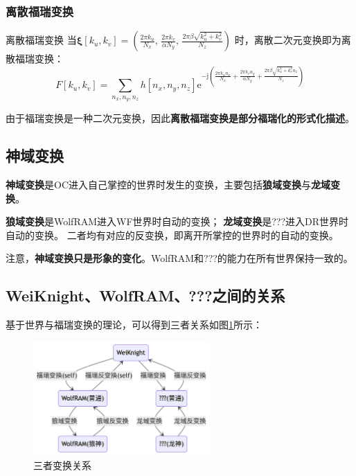 \documentclass[lang=cn,newtx,10pt,scheme=chinese]{elegantbook}
\newcommand{\wf}{WolfRAM}
\newcommand{\dr}{???}
\newcommand{\wkn}{WeiKnight}
\newcommand{\me}{\mathrm{e}}
\newcommand{\mj}{\mathrm{j}}
\begin{document}
\subsubsection{离散福瑞变换}
\begin{definition}{离散福瑞变换}
    当\(\bm{\xi}[k_u,k_v]=\left(\frac{2\pi k_u}{N_x},\, \frac{2\pi k_v}{\alpha N_y},\, \frac{2\pi \beta \sqrt{k_u^2+k_v^2}}{N_z}\right)\)
    时，离散二次元变换即为离散福瑞变换：
    \[
        F[k_u,k_v] = \sum_{n_x,n_y,n_z} h[n_x,n_y,n_z] \me^{-\mj \left(\frac{2\pi k_u n_x}{N_x} + \frac{2\pi k_v n_y}{\alpha N_y} + \frac{2\pi \beta \sqrt{k_u^2+k_v^2} n_z}{N_z}\right)}
    \]
\end{definition}

由于福瑞变换是一种二次元变换，因此\textbf{离散福瑞变换是部分福瑞化的形式化描述}。


\subsection{神域变换}
\textbf{神域变换}是OC进入自己掌控的世界时发生的变换，主要包括\textbf{狼域变换}与\textbf{龙域变换}。

\textbf{狼域变换}是\wf{}进入WF世界时自动的变换；
\textbf{龙域变换}是\dr{}进入DR世界时自动的变换。
二者均有对应的反变换，即离开所掌控的世界时的自动的变换。

注意，\textbf{神域变换只是形象的变化}。\wf{}和\dr{}的能力在所有世界保持一致的。

\subsection{\wkn{}、\wf{}、\dr{}之间的关系}
基于世界与福瑞变换的理论，可以得到三者关系如图\ref{fig:transform}所示：

\begin{figure}[H]
    \centering
    \includegraphics[width=0.6\textwidth]{figure/transform.png}
    \caption{三者变换关系}
    \label{fig:transform}
\end{figure}
\end{document}
